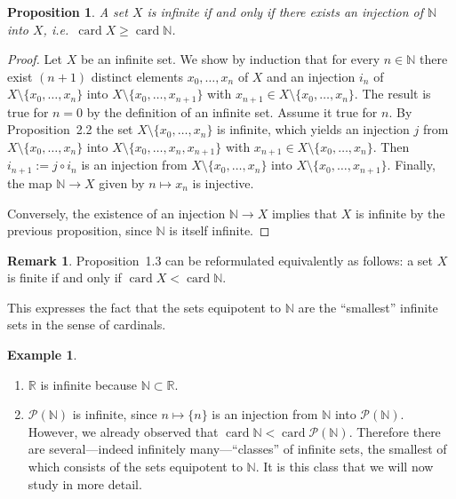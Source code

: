 \documentclass[12pt]{article}
\newtheorem{proposition}{Proposition}[section]
\theoremstyle{definition}
\newtheorem{example}{Example}[section]
\newtheorem{remark}{Remark}[section]
\begin{document}
\begin{proposition}
A set $X$ is infinite if and only if there exists an injection of $\mathbb N$ into $X$, i.e.\ $\operatorname{card} X \ge \operatorname{card}\mathbb N$.
\end{proposition}

\begin{proof}
Let $X$ be an infinite set.
We show by induction that for every $n\in\mathbb N$ there exist $(n+1)$ distinct elements $x_0,\dots,x_n$ of $X$ and an injection $i_n$ of $X\setminus\{x_0,\dots,x_n\}$ into $X\setminus\{x_0,\dots,x_{n+1}\}$ with $x_{n+1}\in X\setminus\{x_0,\dots,x_n\}$.
The result is true for $n=0$ by the definition of an infinite set.
Assume it true for $n$.
By Proposition~2.2 the set $X\setminus\{x_0,\dots,x_n\}$ is infinite, which yields an injection $j$ from $X\setminus\{x_0,\dots,x_n\}$ into $X\setminus\{x_0,\dots,x_n,x_{n+1}\}$ with $x_{n+1}\in X\setminus\{x_0,\dots,x_n\}$.
Then $i_{n+1}:=j\circ i_n$ is an injection from $X\setminus\{x_0,\dots,x_n\}$ into $X\setminus\{x_0,\dots,x_{n+1}\}$.
Finally, the map $\mathbb N\to X$ given by $n\mapsto x_n$ is injective.

Conversely, the existence of an injection $\mathbb N\to X$ implies that $X$ is infinite by the previous proposition, since $\mathbb N$ is itself infinite.
\end{proof}

\begin{remark}
Proposition~1.3 can be reformulated equivalently as follows:
a set $X$ is finite if and only if $\operatorname{card} X < \operatorname{card}\mathbb N$.
\end{remark}

This expresses the fact that the sets equipotent to $\mathbb N$ are the ``smallest'' infinite sets in the sense of cardinals.

\begin{example}
\begin{enumerate}[leftmargin=2em,label=\arabic*.]
\item $\mathbb R$ is infinite because $\mathbb N\subset\mathbb R$.
\item $\mathcal P(\mathbb N)$ is infinite, since $n\mapsto\{n\}$ is an injection from $\mathbb N$ into $\mathcal P(\mathbb N)$.
However, we already observed that $\operatorname{card}\mathbb N < \operatorname{card}\mathcal P(\mathbb N)$.
Therefore there are several---indeed infinitely many---``classes'' of infinite sets, the smallest of which consists of the sets equipotent to $\mathbb N$.
It is this class that we will now study in more detail.
\end{enumerate}

\end{example}
\end{document}

